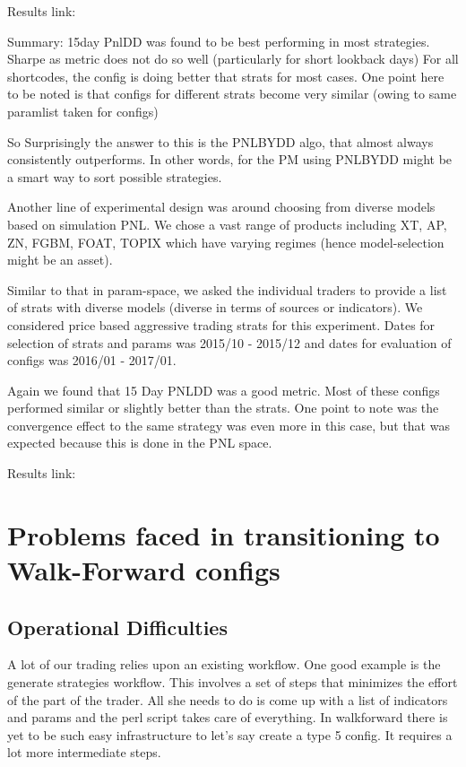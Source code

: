 \documentclass[a4paper]{article}
\begin{document}
Results link:
 


Summary: 
15day PnlDD was found to be best performing in most strategies.
Sharpe as metric does not do so well (particularly for short lookback days)
For all shortcodes, the config is doing better that strats for most cases.
One point here to be noted is that configs for different strats become very similar (owing to same paramlist taken for configs)



So Surprisingly the answer to this is the PNLBYDD algo, that almost always consistently outperforms. In other words, for the PM using PNLBYDD might be a smart way to sort possible strategies.


Another line of experimental design was around choosing from diverse models based on simulation PNL. We chose a vast range of products including XT, AP, ZN, FGBM, FOAT, TOPIX which have varying regimes (hence model-selection might be an asset).

Similar to that in param-space, we asked the individual traders to provide a list of strats with diverse models (diverse in terms of sources or indicators). We considered price based aggressive trading strats for this experiment. Dates for selection of strats and params was 2015/10 - 2015/12
and dates for evaluation of configs was 2016/01 - 2017/01.


Again we found that 15 Day PNLDD was a good metric. Most of these configs performed similar or slightly better than the strats. One point to note was the convergence effect to the same strategy was even more in this case, but that was expected because this is done in the PNL space.


Results link: 


\section{Problems faced in transitioning to Walk-Forward configs \label{problems}}
\subsection{Operational Difficulties}
	
	A lot of our trading relies upon an existing workflow. One good example is the generate strategies workflow. This involves a set of steps that minimizes the effort of the part of the trader. All she needs to do is come up with a list of indicators and params and the perl script takes care of everything. In walkforward there is yet to be such easy infrastructure to let's say create a type 5 config. It requires a lot more intermediate steps.
	
\end{document}
